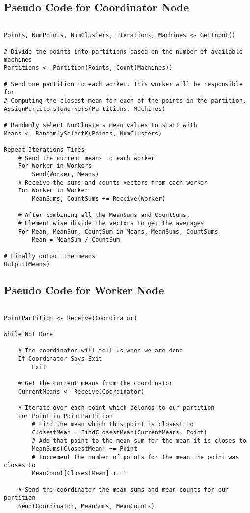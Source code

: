 \documentclass[12pt]{article}
\begin{document}
\subsection{Pseudo Code for Coordinator Node}
\begin{Verbatim}[fontsize=\small]

Points, NumPoints, NumClusters, Iterations, Machines <- GetInput()

# Divide the points into partitions based on the number of available machines
Partitions <- Partition(Points, Count(Machines))

# Send one partition to each worker. This worker will be responsible for 
# Computing the closest mean for each of the points in the partition.
AssignPartitonsToWorkers(Partitions, Machines)

# Randomly select NumClusters mean values to start with
Means <- RandomlySelectK(Points, NumClusters)

Repeat Iterations Times
    # Send the current means to each worker
    For Worker in Workers
        Send(Worker, Means)
    # Receive the sums and counts vectors from each worker
    For Worker in Worker
        MeanSums, CountSums += Receive(Worker)

    # After combining all the MeanSums and CountSums,
    # Element wise divide the vectors to get the averages
    For Mean, MeanSum, CountSum in Means, MeanSums, CountSums
        Mean = MeanSum / CountSum

# Finally output the means
Output(Means)

\end{Verbatim} 

\newpage

\subsection{Pseudo Code for Worker Node}
\begin{Verbatim}[fontsize=\small]

PointPartition <- Receive(Coordinator)

While Not Done

    # The coordinator will tell us when we are done
    If Coordinator Says Exit
        Exit

    # Get the current means from the coordinator
    CurrentMeans <- Receive(Coordinator)

    # Iterate over each point which belongs to our partition
    For Point in PointPartition
        # Find the mean which this point is closest to
        ClosestMean = FindClosestMean(CurrentMeans, Point)
        # Add that point to the mean sum for the mean it is closes to
        MeanSums[ClosestMean] += Point
        # Increment the number of points for the mean the point was closes to
        MeanCount[ClosestMean] += 1

    # Send the coordinator the mean sums and mean counts for our partition
    Send(Coordinator, MeanSums, MeanCounts)

\end{Verbatim} 
\end{document}
